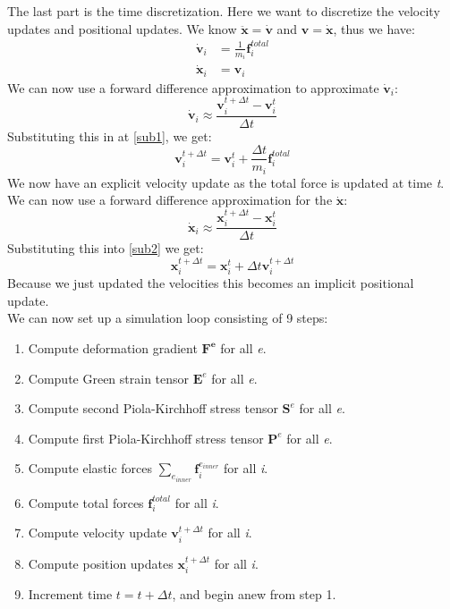 The last part is the time discretization. Here we want to discretize the velocity updates and positional updates. We know $\ddot{\mathbf{x}} = \dot{\mathbf{v}}$ and $\mathbf{v} = \dot{\mathbf{x}}$, thus we have:
\begin{align}
	\dot{\mathbf{v}}_i &= \frac{1}{m_i}\mathbf{f}^{total}_i \label{sub1}\\
	\dot{\mathbf{x}}_i &= \mathbf{v}_i\label{sub2}
\end{align}
We can now use a forward difference approximation to approximate $\dot{\mathbf{v}}_i$:
\begin{equation*}
	\dot{\mathbf{v}}_i \approx \frac{\mathbf{v}^{t+\Delta t}_i - \mathbf{v}^t_i}{\Delta t}
\end{equation*}
Substituting this in at \autoref{sub1}, we get:
\begin{equation*}
	\mathbf{v}^{t+\Delta t}_i = \mathbf{v}^t_i + \frac{\Delta t}{m_i}\mathbf{f}^{total}_i 
\end{equation*}
We now have an explicit velocity update as the total force is updated at time \textit{t}.\\
We can now use a forward difference approximation for the $\dot{\mathbf{x}}$:
\begin{equation*}
	\dot{\mathbf{x}}_i \approx \frac{\mathbf{x}^{t+\Delta t}_i - \mathbf{x}^t_i}{\Delta t}
\end{equation*}
Substituting this into \autoref{sub2} we get:
\begin{equation*}
	\mathbf{x}^{t+\Delta t}_i = \mathbf{x}^t_i + \Delta t \mathbf{v}^{t+\Delta t}_i 
\end{equation*}
Because we just updated the velocities this becomes an implicit positional update.\\

We can now set up a simulation loop consisting of 9 steps:
\begin{enumerate}
	\item Compute deformation gradient $\mathbf{F^e}$ for all \textit{e}.
	\item Compute Green strain tensor $\mathbf{E}^e$ for all \textit{e}.
	\item Compute second Piola-Kirchhoff stress tensor $\mathbf{S}^e$ for all \textit{e}.
	\item Compute first Piola-Kirchhoff stress tensor $\mathbf{P}^e$ for all \textit{e}.
	\item Compute elastic forces  $\sum_{e_{inner}} \mathbf{f}^{e_{inner}}_i$ for all \textit{i}.
	\item Compute total forces $\mathbf{f}^{total}_i$ for all \textit{i}.
	\item Compute velocity update $\mathbf{v}^{t+\Delta t}_i$ for all \textit{i}.
	\item Compute position updates $\mathbf{x}^{t+\Delta t}_i$ for all \textit{i}.
	\item Increment time $t = t + \Delta t$, and begin anew from step 1.
\end{enumerate}